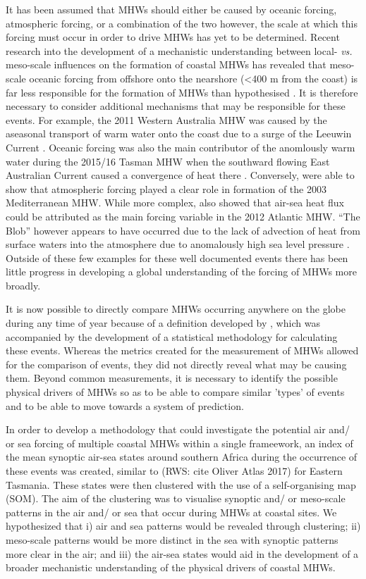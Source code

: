 \documentclass[a4paper,10pt,review]{elsarticle}
\begin{document}
It has been assumed that MHWs should either be caused by oceanic forcing, atmospheric forcing, or a combination of the two however, the scale at which this forcing must occur in order to drive MHWs has yet to be determined. Recent research into the development of a mechanistic understanding between local- \emph{vs.} meso-scale influences on the formation of coastal MHWs has revealed that meso-scale oceanic forcing from offshore onto the nearshore (<400 m from the coast) is far less responsible for the formation of MHWs than hypothesised \citep{Schlegel2017}. It is therefore necessary to consider additional mechanisms that may be responsible for these events. For example, the 2011 Western Australia MHW \citep{Pearce2013} was caused by the aseasonal transport of warm water onto the coast due to a surge of the Leeuwin Current \citep{Feng2013, Benthuysen2014}. Oceanic forcing was also the main contributor of the anomlously warm water during the 2015/16 Tasman MHW when the southward flowing East Australian Current caused a convergence of heat there \citep{Oliver2017}. Conversely, \citet{Garrabou2009} were able to show that atmospheric forcing played a clear role in formation of the 2003 Mediterranean MHW. While more complex, \citet{Chen2015a} also showed that air-sea heat flux could be attributed as the main forcing variable in the 2012 Atlantic MHW. ``The Blob'' however appears to have occurred due to the lack of advection of heat from surface waters into the atmosphere due to anomalously high sea level pressure \citep{Bond2015a}. Outside of these few examples for these well documented events there has been little progress in developing a global understanding of the forcing of MHWs more broadly.

It is now possible to directly compare MHWs occurring anywhere on the globe during any time of year because of a definition developed by \citet{Hobday2016}, which was accompanied by the development of a statistical methodology for calculating these events. Whereas the metrics created for the measurement of MHWs allowed for the comparison of events, they did not directly reveal what may be causing them. Beyond common measurements, it is necessary to identify the possible physical drivers of MHWs so as to be able to compare similar 'types' of events and to be able to move towards a system of prediction.

In order to develop a methodology that could investigate the potential air and/ or sea forcing of multiple coastal MHWs within a single frameework, an index of the mean synoptic air-sea states around southern Africa during the occurrence of these events was created, similar to (RWS: cite Oliver Atlas 2017) for Eastern Tasmania. These states were then clustered with the use of a self-organising map (SOM). The aim of the clustering was to visualise synoptic and/ or meso-scale patterns in the air and/ or sea that occur during MHWs at coastal sites. We hypothesized that i) air and sea patterns would be revealed through clustering; ii) meso-scale patterns would be more distinct in the sea with synoptic patterns more clear in the air; and iii) the air-sea states would aid in the development of a broader mechanistic understanding of the physical drivers of coastal MHWs.
\end{document}
